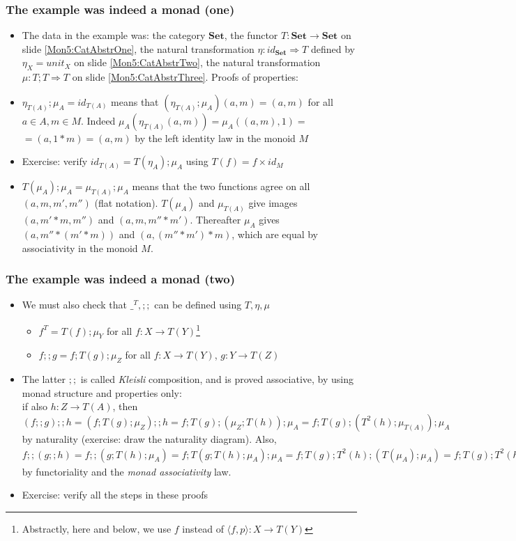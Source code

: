 \documentclass[handout]{beamer}
\newcommand{\To}{\Rightarrow}
\newcommand{\bfsf}[1]{{\boldsymbol{#1}}}
\newcommand{\Set}{\bfsf{Set}}
\newcommand{\Kp}[1]{{\langle #1 \rangle}}
\newcommand{\Kc}{;\!;}
\begin{document}
\frame
  {   
    \frametitle{The example was indeed a monad (one)}\label{Mon5:ExaMonadOne}

 \begin{itemize}[<+->]
\item The data in the example was: the category $\Set$, 
the functor $T:\Set\to\Set$ on slide \ref{Mon5:CatAbstrOne}, 
the natural transformation $\eta: id_\Set\To T$
defined by $\eta_X = unit_X$ on slide \ref{Mon5:CatAbstrTwo}, 
the natural transformation $\mu: T;T \To T$
on slide \ref{Mon5:CatAbstrThree}. Proofs of properties:
\item $\eta_{T(A)};\mu_A = id_{T(A)}$ means that  $(\eta_{T(A)};\mu_A)(a,m) = (a,m)$
for all $a\in A, m\in M$. Indeed $\mu_A(\eta_{T(A)}(a,m)) = \mu_A((a,m),1) =$ $= (a,1*m) = (a,m)$
by the left identity law in the monoid $M$
\item Exercise: verify  $id_{T(A)} = T(\eta_A);\mu_A$ using $T(f) = f\times id_M$
\item $T(\mu_A);\mu_A = \mu_{T(A)};\mu_A$ means that the two functions agree
on all $(a,m,m',m'')$ (flat notation). $T(\mu_A)$ and $\mu_{T(A)}$ give images $(a,m'*m,m'')$ and $(a,m,m''*m')$. Thereafter $\mu_A$ gives $(a,m''*(m'*m))$ and $(a,(m''*m')*m)$, which are equal by associativity in the monoid $M$.
 \end{itemize}

 }

\frame
  {   
    \frametitle{The example was indeed a monad (two)}\label{Mon5:ExaMonadTwo}

 \begin{itemize}[<+->]
\item We must also check that $\_^T, \Kc$ can be defined using $T,\eta,\mu$
 \begin{itemize}
\item $f^T = T(f);\mu_Y$ for all $f: X\to T(Y)$\footnote{Abstractly, here and below,
we use $f$ instead of $\Kp{f,p}:X\to T(Y)$}
\item $f \Kc  g = f ;T(g);\mu_Z$ for all $f: X\to T(Y)$, $g: Y\to T(Z)$
 \end{itemize}
\item The latter $\Kc$ is called \emph{Kleisli} composition, and is proved
associative, by using monad structure and properties only:\\
if also $h: Z\to T(A)$, then
$(f \Kc g) \Kc h = (f ;T(g);\mu_Z) \Kc h = f ;T(g);(\mu_Z; T(h)) ; \mu_A =
f ;T(g);(T^2(h);\mu_{T(A)}) ; \mu_A$ by naturality (exercise: draw the naturality diagram). 
Also, $f \Kc (g \Kc h) = f \Kc (g;T(h);\mu_A) = f; T(g;T(h);\mu_A);\mu_A =
f; T(g);T^2(h);(T(\mu_A);\mu_A) = f; T(g);T^2(h);(\mu_{T(A)};\mu_A)$
by functoriality and the \emph{monad associativity} law.

\item Exercise: verify all the steps in these proofs
 \end{itemize}

 }
\end{document}
